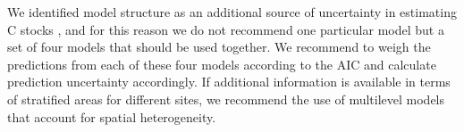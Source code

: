 \documentclass[review, authoryear]{elsarticle}   	%
\begin{document}
We identified model structure as an additional source of uncertainty in estimating C stocks \citep[cf][]{IPCC2006}, and for this reason we do  not recommend one particular model but a set of four models that should be used together. We recommend to weigh the predictions from each of these four models according to the AIC and calculate prediction uncertainty accordingly. If additional information is available in terms of stratified areas for different sites, we recommend the use of multilevel models that account for spatial heterogeneity. 

%
%
%
\end{document}
